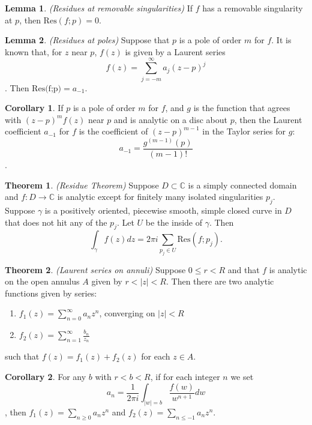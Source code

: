 \documentclass[a4paper]{article}
\theoremstyle{definition}
\newtheorem{theorem}{Theorem}
\newtheorem{lemma}{Lemma}
\newtheorem{corollary}{Corollary}
\begin{document}
	\begin{lemma}
		\emph{(Residues at removable singularities)}
		If $f$ has a removable singularity at $p$, then $\text{Res}(f;p) = 0$.
	\end{lemma}
	
	\begin{lemma}
		\emph{(Residues at poles)}
		Suppose that $p$ is a pole of order $m$ for $f$. It is known that, for $z$ near $p$, $f(z)$ is given by a Laurent series
		$$f(z) = \sum_{j=-m}^{\infty} a_{j} (z-p)^{j}$$.
		Then $\text{Res(f;p)} = a_{-1}$.
	\end{lemma}
	
	\begin{corollary}
		If $p$ is a pole of order $m$ for $f$, and $g$ is the function that agrees with $(z-p)^{m} f(z)$ near $p$ and is analytic on a disc about $p$, then the Laurent coefficient $a_{-1}$ for $f$ is the coefficient of $(z-p)^{m-1}$ in the Taylor series for $g$:
		$$a_{-1} = \frac{g^{(m-1)}(p)}{(m-1)!}$$.
	\end{corollary}
	
	\begin{theorem}
		\emph{(Residue Theorem)}
		Suppose $D \subset \mathbb{C}$ is a simply connected domain and $f : D \rightarrow \mathbb{C}$ is analytic except for finitely many isolated singularities $p_{j}$. Suppose $\gamma$ is a positively oriented, piecewise smooth, simple closed curve in $D$ that does not hit any of the $p_{j}$. Let $U$ be the inside of $\gamma$. Then
		$$\int_{\gamma}f(z) dz = 2 \pi i \sum_{p_{j} \in U}\text{Res}(f;p_{j}).$$
	\end{theorem}
	
	\begin{theorem}
		\emph{(Laurent series on annuli)}
		Suppose $0 \leq r < R$ and that $f$ is analytic on the open annulus $A$ given by $r < |z| < R$. Then there are two analytic functions given by series:
		\begin{enumerate}[label=\alph*.]
			\item $f_{1}(z) = \sum_{n=0}^{\infty} a_{n} z^{n}$, converging on $|z| < R$
			\item $f_{2}(z) = \sum_{n=1}^{\infty} \frac{b_{n}}{z_{n}}$
		\end{enumerate}
		such that $f(z) = f_{1}(z) + f_{2}(z)$ for each $z \in A$.
	\end{theorem}
	
	\begin{corollary}
		For any $b$ with $r < b < R$, if for each integer $n$ we set
		$$a_{n} = \frac{1}{2 \pi i} \int_{|w| = b} \frac{f(w)}{w^{n+1}} dw$$,
		then $f_{1}(z) = \sum_{n \geq 0} a_{n} z^{n}$ and $f_{2}(z) = \sum_{n \leq -1} a_{n} z^{n}$.
	\end{corollary}
	
\end{document}
